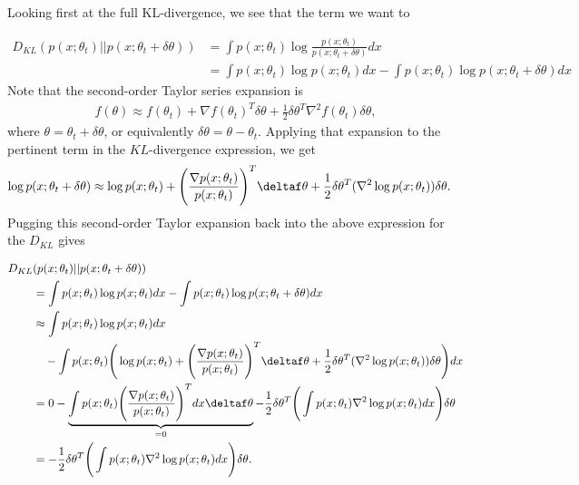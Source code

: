 Looking first at the full KL-divergence, we see that the term we want to 

\begin{align*}
	D_{KL}(p(x;\theta_t)||p(x;\theta_t+\delta \theta)) &= \int p(x;\theta_t)\log \frac{p(x;\theta_t)}{p(x;\theta_t+\delta \theta)} dx\\
	&= \int p(x;\theta_t)\log p(x;\theta_t) dx - \int p(x;\theta_t)\log p(x;\theta_t+\delta \theta) dx
\end{align*}
Note that the second-order Taylor series expansion is
\begin{align*}
	f(\theta) \approx f(\theta_t) + \nabla f(\theta_t)^T\delta\theta + \frac{1}{2} \delta\theta^T\nabla^2f(\theta_t)\delta\theta,
\end{align*}
where $\theta=\theta_t+\delta\theta$, or equivalently $\delta\theta = \theta-\theta_t$. Applying that expansion to the pertinent term in the $KL$-divergence expression, we get
\begin{align*}
	\log p(x;\theta_t+\delta \theta) &\approx \log p(x;\theta_t) + \Bigg(\frac{\nabla p(x;\theta_t)}{p(x;\theta_t)}\Bigg)^T \deltaf\theta + \frac{1}{2}\delta\theta^T (\nabla^2 \log p(x;\theta_t))\delta\theta.
\end{align*}
Pugging this second-order Taylor expansion back into the above expression for the $D_{KL}$ gives

\begin{align*}
	D_{KL}&(p(x;\theta_t)||p(x;\theta_t+\delta \theta))\\ &= \int p(x;\theta_t)\log p(x;\theta_t) dx - \int p(x;\theta_t)\log p(x;\theta_t+\delta \theta) dx\\
	&\approx \int p(x;\theta_t)\log p(x;\theta_t) dx\\
	&\quad - \int p(x;\theta_t)\Bigg(\log p(x;\theta_t) + \Bigg(\frac{\nabla p(x;\theta_t)}{p(x;\theta_t)}\Bigg)^T \deltaf\theta + \frac{1}{2}\delta\theta^T (\nabla^2 \log p(x;\theta_t))\delta\theta \Bigg)dx\\
	&= 0 - \underbrace{\int p(x;\theta_t)\Bigg(\frac{\nabla p(x;\theta_t)}{p(x;\theta_t)}\Bigg)^T dx \deltaf\theta}_{=0} - \frac{1}{2}\delta\theta^T\Bigg(\int p(x;\theta_t) \nabla^2 \log p(x;\theta_t) dx\Bigg) \delta\theta\\
	&= -\frac{1}{2}\delta\theta^T\Bigg(\int p(x;\theta_t) \nabla^2 \log p(x;\theta_t) dx\Bigg) \delta\theta.
\end{align*}

